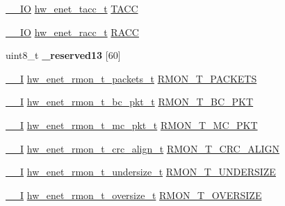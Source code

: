 \begin{DoxyCompactItemize}
\item 
\hyperlink{core__sc300_8h_aec43007d9998a0a0e01faede4133d6be}{\+\_\+\+\_\+\+IO} \hyperlink{union__hw__enet__tacc}{hw\+\_\+enet\+\_\+tacc\+\_\+t} \hyperlink{struct__hw__enet_a63564b5fd15feb599f1ddbfa0db42bc5}{T\+A\+CC}
\item 
\hyperlink{core__sc300_8h_aec43007d9998a0a0e01faede4133d6be}{\+\_\+\+\_\+\+IO} \hyperlink{union__hw__enet__racc}{hw\+\_\+enet\+\_\+racc\+\_\+t} \hyperlink{struct__hw__enet_a736659a4014abadb3067340a3f5cb85c}{R\+A\+CC}
\item 
uint8\+\_\+t {\bfseries \+\_\+reserved13} \mbox{[}60\mbox{]}\hypertarget{struct__hw__enet_aa692b5e2d070fd6eb0a6d43ca2762aad}{}\label{struct__hw__enet_aa692b5e2d070fd6eb0a6d43ca2762aad}

\item 
\hyperlink{core__sc300_8h_af63697ed9952cc71e1225efe205f6cd3}{\+\_\+\+\_\+I} \hyperlink{union__hw__enet__rmon__t__packets}{hw\+\_\+enet\+\_\+rmon\+\_\+t\+\_\+packets\+\_\+t} \hyperlink{struct__hw__enet_a668335ec3c6a8258ec5877b29ae7b112}{R\+M\+O\+N\+\_\+\+T\+\_\+\+P\+A\+C\+K\+E\+TS}
\item 
\hyperlink{core__sc300_8h_af63697ed9952cc71e1225efe205f6cd3}{\+\_\+\+\_\+I} \hyperlink{union__hw__enet__rmon__t__bc__pkt}{hw\+\_\+enet\+\_\+rmon\+\_\+t\+\_\+bc\+\_\+pkt\+\_\+t} \hyperlink{struct__hw__enet_af69899372ec818326e046d7f33c42be6}{R\+M\+O\+N\+\_\+\+T\+\_\+\+B\+C\+\_\+\+P\+KT}
\item 
\hyperlink{core__sc300_8h_af63697ed9952cc71e1225efe205f6cd3}{\+\_\+\+\_\+I} \hyperlink{union__hw__enet__rmon__t__mc__pkt}{hw\+\_\+enet\+\_\+rmon\+\_\+t\+\_\+mc\+\_\+pkt\+\_\+t} \hyperlink{struct__hw__enet_a3484e7e33bcf2dbbc3cd2ff098a59add}{R\+M\+O\+N\+\_\+\+T\+\_\+\+M\+C\+\_\+\+P\+KT}
\item 
\hyperlink{core__sc300_8h_af63697ed9952cc71e1225efe205f6cd3}{\+\_\+\+\_\+I} \hyperlink{union__hw__enet__rmon__t__crc__align}{hw\+\_\+enet\+\_\+rmon\+\_\+t\+\_\+crc\+\_\+align\+\_\+t} \hyperlink{struct__hw__enet_a6ae18184cdd318706d4c953b523b5684}{R\+M\+O\+N\+\_\+\+T\+\_\+\+C\+R\+C\+\_\+\+A\+L\+I\+GN}
\item 
\hyperlink{core__sc300_8h_af63697ed9952cc71e1225efe205f6cd3}{\+\_\+\+\_\+I} \hyperlink{union__hw__enet__rmon__t__undersize}{hw\+\_\+enet\+\_\+rmon\+\_\+t\+\_\+undersize\+\_\+t} \hyperlink{struct__hw__enet_a2a8c87ee9ff26e578d2655dae28cfdff}{R\+M\+O\+N\+\_\+\+T\+\_\+\+U\+N\+D\+E\+R\+S\+I\+ZE}
\item 
\hyperlink{core__sc300_8h_af63697ed9952cc71e1225efe205f6cd3}{\+\_\+\+\_\+I} \hyperlink{union__hw__enet__rmon__t__oversize}{hw\+\_\+enet\+\_\+rmon\+\_\+t\+\_\+oversize\+\_\+t} \hyperlink{struct__hw__enet_a278c9422bc5f9d54e565b1178c8a1791}{R\+M\+O\+N\+\_\+\+T\+\_\+\+O\+V\+E\+R\+S\+I\+ZE}

\end{DoxyCompactItemize}

